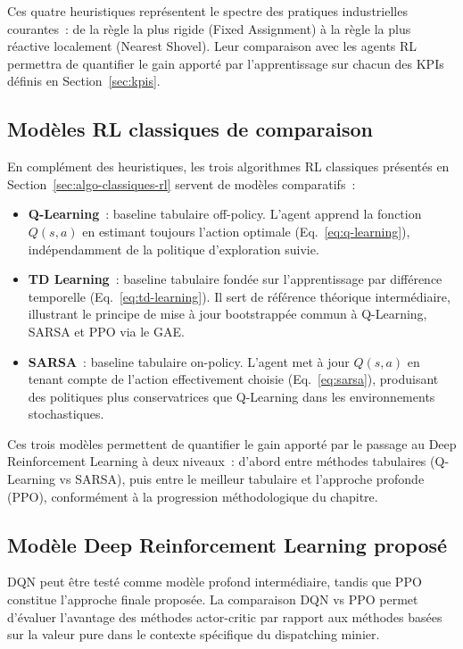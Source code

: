 \documentclass[11pt,a4paper]{report}
\begin{document}
Ces quatre heuristiques représentent le spectre des pratiques industrielles courantes~: de la règle la plus rigide (Fixed Assignment) à la règle la plus réactive localement (Nearest Shovel). Leur comparaison avec les agents RL permettra de quantifier le gain apporté par l'apprentissage sur chacun des KPIs définis en Section~\ref{sec:kpis}.

\subsection{Modèles RL classiques de comparaison}
\label{sec:modeles-rl-comparaison}
En complément des heuristiques, les trois algorithmes RL classiques 
présentés en Section~\ref{sec:algo-classiques-rl} servent de modèles 
comparatifs~:

\begin{itemize}
    \item \textbf{Q-Learning}~: baseline tabulaire off-policy. L'agent 
    apprend la fonction $Q(s, a)$ en estimant toujours l'action optimale 
    (Eq.~\ref{eq:q-learning}), indépendamment de la politique 
    d'exploration suivie.

    \item \textbf{TD Learning}~: baseline tabulaire fondée sur 
    l'apprentissage par différence temporelle (Eq.~\ref{eq:td-learning}). 
    Il sert de référence théorique intermédiaire, illustrant le principe 
    de mise à jour bootstrappée commun à Q-Learning, SARSA et PPO via 
    le GAE.

    \item \textbf{SARSA}~: baseline tabulaire on-policy. L'agent met à 
    jour $Q(s, a)$ en tenant compte de l'action effectivement choisie 
    (Eq.~\ref{eq:sarsa}), produisant des politiques plus conservatrices 
    que Q-Learning dans les environnements stochastiques.
\end{itemize}

Ces trois modèles permettent de quantifier le gain apporté par le passage au Deep Reinforcement Learning à deux niveaux~: d'abord entre méthodes tabulaires (Q-Learning vs SARSA), puis entre le meilleur tabulaire et l'approche profonde (PPO), conformément à la progression méthodologique du chapitre.

\subsection{Modèle Deep Reinforcement Learning proposé}
\label{sec:modele-deep-rl}
DQN peut être testé comme modèle profond intermédiaire, tandis que PPO constitue l'approche finale proposée. La comparaison DQN vs PPO permet d'évaluer l'avantage des méthodes actor-critic par rapport aux méthodes basées sur la valeur pure dans le contexte spécifique du dispatching minier.
\end{document}
